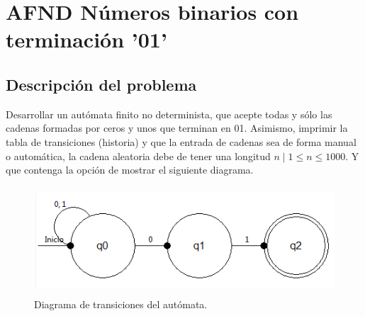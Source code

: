 \section{AFND Números binarios con terminación '01'}
	\subsection{Descripción del problema}
	Desarrollar un autómata finito no determinista, que acepte todas y sólo las cadenas formadas por ceros y unos que terminan en 01. Asimismo, imprimir la tabla de transiciones (historia) y que la entrada de cadenas sea de forma manual o automática, la cadena aleatoria debe de tener una longitud $n \mid 1  \leq n \leq 1000$. Y que contenga la opción de mostrar el siguiente diagrama.
	\begin{figure}[H]
		\begin{center}
			\includegraphics[width=12cm, height=4cm]{img/cero-uno.png}
			\caption{Diagrama de transiciones del autómata. \cite{LIBRO}}
			\label{fig:diagrama4}
		\end{center}
	\end{figure}
